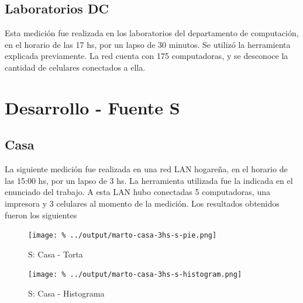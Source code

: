 \documentclass[final,inline,a4paper,narroweqnarray]{ieee}
\begin{document}
\subsection{Laboratorios DC}

  Esta medición fue realizada en los laboratorios del departamento de
  computación, en el horario de las 17 hs, por un lapso de 30 minutos.
  Se utilizó la herramienta explicada previamente. La red cuenta con
  175 computadoras, y se desconoce la cantidad de celulares conectados
  a ella.

\section{Desarrollo - Fuente S}
  \subsection{Casa}

  La siguiente medición fue realizada en una red LAN hogareña, en el horario
  de las 15:00 hs, por un lapso de 3 hs. La herramienta utilizada fue la
  indicada en el enunciado del trabajo. A esta LAN hubo conectadas 5 computadoras,
  una impresora y 3 celulares al momento de la medición. Los resultados obtenidos
  fueron los siguientes


    \begin{figure}[ht]\begin{center}
      \texttt{[image: \%
      ../output/marto-casa-3hs-s-pie.png]}
      \vspace{-3em}
      \caption{S: Casa - Torta}
      \label{marto-casa-3hs-s-pie}
    \end{center}\end{figure}

    
    \begin{figure}[ht]\begin{center}
     \texttt{[image: \%
      ../output/marto-casa-3hs-s-histogram.png]}
      \caption{S: Casa - Histograma}
      \label{marto-casa-3hs-s-histogram}
    \end{center}\end{figure}
\end{document}
